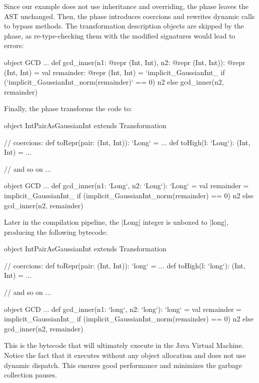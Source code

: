 Since our example does not use inheritance and overriding, the \bridge{} phase leaves the AST unchanged.  Then, the \coerce{} phase introduces coercions and rewrites dynamic calls to bypass methods. The transformation description objects are skipped by the \coerce{} phase, as re-type-checking them with the modified signatures would lead to errors:

\begin{lstlisting-nobreak}
object GCD {
  ...
  def gcd_inner(n1: @repr (Int, Int), n2: @repr (Int, Int)): @repr (Int, Int) = {
    val remainder: @repr (Int, Int) = `implicit_GaussianInt_%
    if (`implicit_GaussianInt_norm(remainder)` == 0) n2 else gcd_inner(n2, remainder)
  }
}
\end{lstlisting-nobreak}

Finally, the \commit{} phase transforms the code to:

\begin{lstlisting-nobreak}
object IntPairAsGaussianInt extends Transformation{
  // coercions:
  def toRepr(pair: (Int, Int)): `Long` = ...
  def toHigh(l: `Long`): (Int, Int) = ...

  // and so on ...
}

object GCD {
  ...
  def gcd_inner(n1: `Long`, n2: `Long`): `Long` = {
    val remainder = implicit_GaussianInt_%
    if (implicit_GaussianInt_norm(remainder) == 0) n2 else gcd_inner(n2, remainder)
  }
}
\end{lstlisting-nobreak}

Later in the compilation pipeline, the |Long| integer is unboxed to |long|, producing the following bytecode:

\begin{lstlisting-nobreak}
object IntPairAsGaussianInt extends Transformation{
  // coercions:
  def toRepr(pair: (Int, Int)): `long` = ...
  def toHigh(l: `long`): (Int, Int) = ...

  // and so on ...
}

object GCD {
  ...
  def gcd_inner(n1: `long`, n2: `long`): `long` = {
    val remainder = implicit_GaussianInt_%
    if (implicit_GaussianInt_norm(remainder) == 0) n2 else gcd_inner(n2, remainder)
  }
}
\end{lstlisting-nobreak}

This is the bytecode that will ultimately execute in the Java Virtual Machine. Notice the fact that it executes without any object allocation and does not use dynamic dispatch. This ensures good performance and minimizes the garbage collection pauses.
